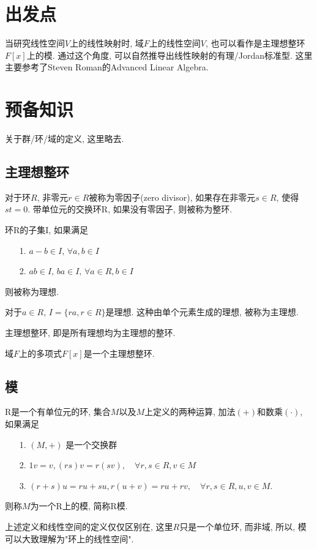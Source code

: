 \section{出发点}
当研究线性空间$V$上的线性映射时, 
域$F$上的线性空间$V$, 也可以看作是主理想整环$F[x]$上的模.
通过这个角度, 可以自然推导出线性映射的有理/Jordan标准型.
这里主要参考了Steven Roman的Advanced Linear Algebra.

\section{预备知识}
关于群/环/域的定义, 这里略去.

\subsection{主理想整环}
\begin{definition}
	对于环$R$, 非零元$r \in R$被称为零因子(zero divisor),
	如果存在非零元$s \in R$, 使得$st = 0$. 
	带单位元的交换环R, 如果没有零因子, 则被称为整环.
\end{definition}

\begin{definition}
	环R的子集I, 如果满足
	\begin{itemize}
		\item[1.] $a - b \in I, \, \forall a,b \in I$
		\item[2.] $ab \in I,\, ba \in I, \, \forall a \in R, b \in I$
	\end{itemize}
	则被称为理想. 
\end{definition}
\begin{remark}
	对于$a \in R$, $I = \{ra, r \in R\}$是理想.
	这种由单个元素生成的理想, 被称为主理想.
\end{remark}

\begin{definition}
主理想整环, 即是所有理想均为主理想的整环.
\end{definition}
\begin{remark}
	域$F$上的多项式$F[x]$是一个主理想整环.
\end{remark}

\subsection{模}
\begin{definition}
R是一个有单位元的环, 集合$M$以及$M$上定义的两种运算,
加法$(+)$和数乘$(\cdot)$, 如果满足
\begin{itemize}
	\item[1.] $(M, +)$ 是一个交换群
	\item[2.] $1v = v, (rs)v = r(sv), \quad \forall r,s \in R, v \in M$
	\item[3.] $(r+s)u = ru + su, r(u+v) = ru + rv, 
	            \quad \forall r,s \in R, u,v \in M.$
\end{itemize}
则称$M$为一个R上的模, 简称R模.
\end{definition}
上述定义和线性空间的定义仅仅区别在, 这里$R$只是一个单位环, 而非域,
所以,
模可以大致理解为"环上的线性空间".

